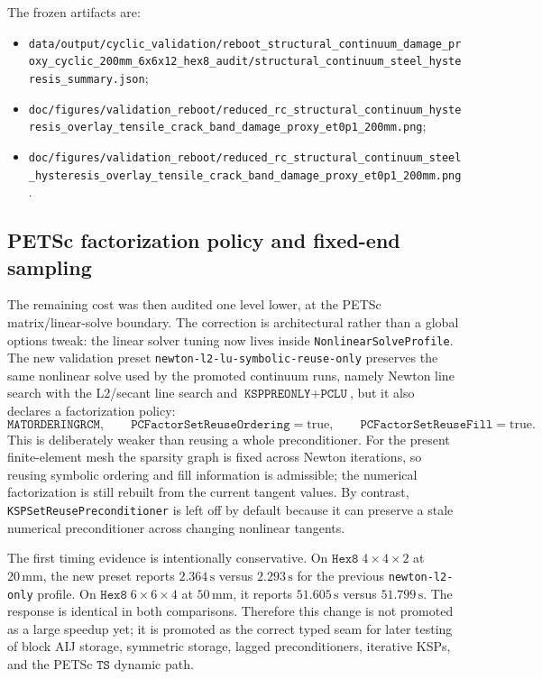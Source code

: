 The frozen artifacts are:
\begin{itemize}
  \item
  \texttt{data/output/cyclic\_validation/reboot\_structural\_continuum\_damage\_proxy\_cyclic\_200mm\_6x6x12\_hex8\_audit/structural\_continuum\_steel\_hysteresis\_summary.json};
  \item
  \texttt{doc/figures/validation\_reboot/reduced\_rc\_structural\_continuum\_hysteresis\_overlay\_tensile\_crack\_band\_damage\_proxy\_et0p1\_200mm.png};
  \item
  \texttt{doc/figures/validation\_reboot/reduced\_rc\_structural\_continuum\_steel\_hysteresis\_overlay\_tensile\_crack\_band\_damage\_proxy\_et0p1\_200mm.png}.
\end{itemize}

\subsection{PETSc factorization policy and fixed-end sampling}

The remaining cost was then audited one level lower, at the PETSc
matrix/linear-solve boundary.  The correction is architectural rather than a
global options tweak: the linear solver tuning now lives inside
\texttt{NonlinearSolveProfile}.  The new validation preset
\texttt{newton-l2-lu-symbolic-reuse-only} preserves the same nonlinear solve
used by the promoted continuum runs, namely Newton line search with the
L2/secant line search and \(\texttt{KSPPREONLY}+\texttt{PCLU}\), but it also
declares a factorization policy:
\[
  \texttt{MATORDERINGRCM},\qquad
  \texttt{PCFactorSetReuseOrdering}=\mathrm{true},\qquad
  \texttt{PCFactorSetReuseFill}=\mathrm{true}.
\]
This is deliberately weaker than reusing a whole preconditioner.  For the
present finite-element mesh the sparsity graph is fixed across Newton
iterations, so reusing symbolic ordering and fill information is admissible;
the numerical factorization is still rebuilt from the current tangent values.
By contrast, \texttt{KSPSetReusePreconditioner} is left off by default because
it can preserve a stale numerical preconditioner across changing nonlinear
tangents.

The first timing evidence is intentionally conservative.  On
\(\texttt{Hex8}\;4\times4\times2\) at \(20\,\mathrm{mm}\), the new preset
reports \(2.364\,\mathrm{s}\) versus \(2.293\,\mathrm{s}\) for the previous
\texttt{newton-l2-only} profile.  On
\(\texttt{Hex8}\;6\times6\times4\) at \(50\,\mathrm{mm}\), it reports
\(51.605\,\mathrm{s}\) versus \(51.799\,\mathrm{s}\).  The response is
identical in both comparisons.  Therefore this change is not promoted as a
large speedup yet; it is promoted as the correct typed seam for later testing
of block AIJ storage, symmetric storage, lagged preconditioners, iterative
KSPs, and the PETSc \(\texttt{TS}\) dynamic path.


